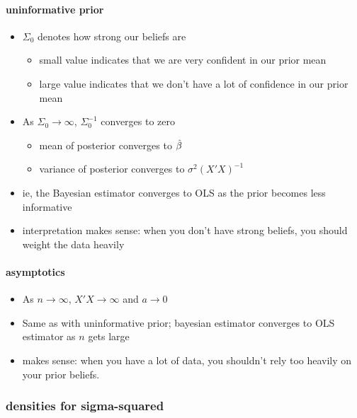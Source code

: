 \paragraph{uninformative prior}
\begin{itemize}
\item $\Sigma_0$ denotes how strong our beliefs are
\begin{itemize}
\item small value indicates that we are very confident in our
           prior mean
\item large value indicates that we don't have a lot of
           confidence in our prior mean
\end{itemize}
\item As $\Sigma_0 \to \infty$, $\Sigma_0^{-1}$ converges to zero
\begin{itemize}
\item mean of posterior converges to $\hat{\beta}$
\item variance of posterior converges to $\sigma^2(X'X)^{-1}$
\end{itemize}
\item ie, the Bayesian estimator converges to OLS as the prior
         becomes less informative
\item interpretation makes sense: when you don't have strong
         beliefs, you should weight the data heavily
\end{itemize}

\paragraph{asymptotics}
\begin{itemize}
\item As $n \to \infty$, $X'X \to \infty$ and $a \to 0$
\item Same as with uninformative prior; bayesian estimator
         converges to OLS estimator as $n$ gets large
\item makes sense: when you have a lot of data, you shouldn't rely
         too heavily on your prior beliefs.
\end{itemize}

\subsubsection{densities for sigma-squared}

